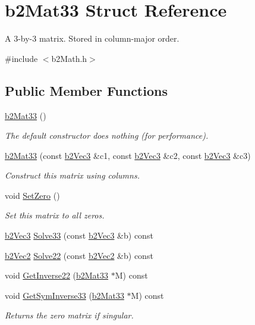 \hypertarget{structb2_mat33}{}\section{b2\+Mat33 Struct Reference}
\label{structb2_mat33}


A 3-\/by-\/3 matrix. Stored in column-\/major order.  




{\ttfamily \#include $<$b2\+Math.\+h$>$}

\subsection*{Public Member Functions}
\begin{DoxyCompactItemize}
\item 
\mbox{\hyperlink{structb2_mat33_a1f4d7ddf1c8a202fc08ec64dfe191463}{b2\+Mat33}} ()
\begin{DoxyCompactList}\small\item\em The default constructor does nothing (for performance). \end{DoxyCompactList}\item 
\mbox{\hyperlink{structb2_mat33_a36d99a037008776c8d09fe0aeb5c759c}{b2\+Mat33}} (const \mbox{\hyperlink{structb2_vec3}{b2\+Vec3}} \&c1, const \mbox{\hyperlink{structb2_vec3}{b2\+Vec3}} \&c2, const \mbox{\hyperlink{structb2_vec3}{b2\+Vec3}} \&c3)
\begin{DoxyCompactList}\small\item\em Construct this matrix using columns. \end{DoxyCompactList}\item 
void \mbox{\hyperlink{structb2_mat33_a42fc6953b025e1c8b59717d0ee7accde}{Set\+Zero}} ()
\begin{DoxyCompactList}\small\item\em Set this matrix to all zeros. \end{DoxyCompactList}\item 
\mbox{\hyperlink{structb2_vec3}{b2\+Vec3}} \mbox{\hyperlink{structb2_mat33_a2ce48f409ba5951a04da821dada9e285}{Solve33}} (const \mbox{\hyperlink{structb2_vec3}{b2\+Vec3}} \&b) const
\item 
\mbox{\hyperlink{structb2_vec2}{b2\+Vec2}} \mbox{\hyperlink{structb2_mat33_acdf892aab7e26283f8aa600ade91dcef}{Solve22}} (const \mbox{\hyperlink{structb2_vec2}{b2\+Vec2}} \&b) const
\item 
void \mbox{\hyperlink{structb2_mat33_aa020bfd08e28c4cecda303ba335fe517}{Get\+Inverse22}} (\mbox{\hyperlink{structb2_mat33}{b2\+Mat33}} $\ast$M) const
\item 
void \mbox{\hyperlink{structb2_mat33_a2620944663233096d3b82bc4b1a991e9}{Get\+Sym\+Inverse33}} (\mbox{\hyperlink{structb2_mat33}{b2\+Mat33}} $\ast$M) const
\begin{DoxyCompactList}\small\item\em Returns the zero matrix if singular. \end{DoxyCompactList}\end{DoxyCompactItemize}
